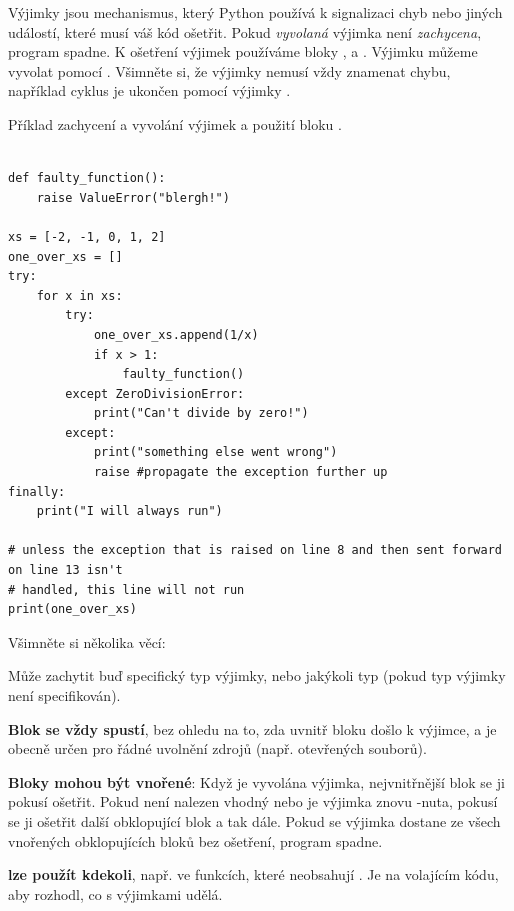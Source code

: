 

\begin{syntax}
    \label{syn:exceptions}
    Výjimky jsou mechanismus, který Python používá k signalizaci chyb nebo jiných událostí, které musí váš kód ošetřit. Pokud \emph{vyvolaná} výjimka není \emph{zachycena}, program spadne. K ošetření výjimek používáme bloky ,  a . Výjimku můžeme vyvolat pomocí . Všimněte si, že výjimky nemusí vždy znamenat chybu, například cyklus  je ukončen pomocí výjimky .

    Příklad zachycení a vyvolání výjimek a použití bloku .
\begin{lstlisting}

def faulty_function():
    raise ValueError("blergh!")

xs = [-2, -1, 0, 1, 2]
one_over_xs = []
try:
    for x in xs:
        try:
            one_over_xs.append(1/x)
            if x > 1:
                faulty_function()
        except ZeroDivisionError:
            print("Can't divide by zero!")
        except:
            print("something else went wrong")
            raise #propagate the exception further up
finally:
    print("I will always run")

# unless the exception that is raised on line 8 and then sent forward on line 13 isn't
# handled, this line will not run
print(one_over_xs)
\end{lstlisting}
    Všimněte si několika věcí:
    
    \textbf{} Může zachytit buď specifický typ výjimky, nebo jakýkoli typ (pokud typ výjimky není specifikován).
    
    \textbf{Blok  se vždy spustí}, bez ohledu na to, zda uvnitř bloku  došlo k výjimce, a je obecně určen pro řádné uvolnění zdrojů (např. otevřených souborů).
        
    \textbf{Bloky  mohou být vnořené}: Když je vyvolána výjimka, nejvnitřnější blok  se ji pokusí ošetřit. Pokud není nalezen vhodný  nebo je výjimka znovu -nuta, pokusí se ji ošetřit další obklopující blok  a tak dále. Pokud se výjimka dostane ze všech vnořených obklopujících bloků  bez ošetření, program spadne.
    
    \textbf{ lze použít kdekoli}, např. ve funkcích, které neobsahují . Je na volajícím kódu, aby rozhodl, co s výjimkami udělá.
\end{syntax}

